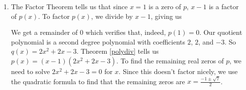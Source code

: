 {\begin{enumerate}
{\[\begin{array}{cccccccccc}
\end{array}\]

\setlength\arraycolsep{5pt}
\setlength\extrarowheight{0pt}}

According to the Remainder Theorem, $p(-2) = -3$.  We can check this by direct substitution into the formula for $p(x)$:  $p(-2) = 2(-2)^3-5(-2)+3 = -16+10+3=-3$.

\item The Factor Theorem tells us that since $x=1$ is a zero of $p$, $x-1$ is a factor of $p(x)$.  To factor $p(x)$, we divide by $x-1$, giving us


We get a remainder of $0$ which verifies that, indeed, $p(1) = 0$.  Our quotient polynomial is a second degree polynomial with coefficients $2$, $2$, and $-3$. So $q(x) = 2x^2 + 2x - 3$.  Theorem \ref{polydiv} tells us $p(x) = (x-1)\left( 2x^2 + 2x - 3\right)$.  To find the remaining real zeros of $p$, we need to solve $2x^2 + 2x - 3=0$ for $x$.  Since this doesn't factor nicely, we use the quadratic formula to find that the remaining zeros are $x = \frac{-1 \pm \sqrt{7}}{2}$.
\end{enumerate}
}

